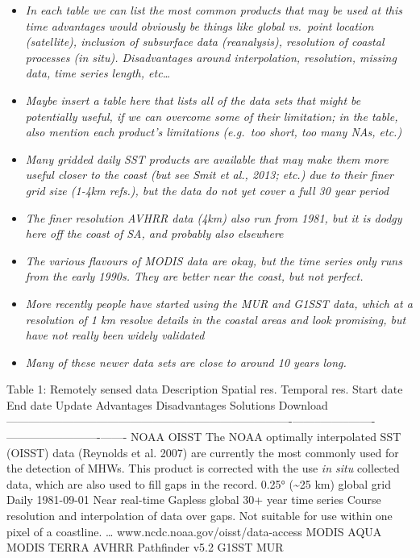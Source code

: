 \documentclass[]{article}
\providecommand{\tightlist}{%
  \setlength{\itemsep}{0pt}\setlength{\parskip}{0pt}}
\begin{document}
\begin{itemize}
\tightlist
\item
  \emph{In each table we can list the most common products that may be
  used at this time advantages would obviously be things like global
  vs.~point location (satellite), inclusion of subsurface data
  (reanalysis), resolution of coastal processes (in situ). Disadvantages
  around interpolation, resolution, missing data, time series length,
  etc\ldots{}}
\item
  \emph{Maybe insert a table here that lists all of the data sets that
  might be potentially useful, if we can overcome some of their
  limitation; in the table, also mention each product's limitations
  (e.g.~too short, too many NAs, etc.)}
\item
  \emph{Many gridded daily SST products are available that may make them
  more useful closer to the coast (but see Smit et al., 2013; etc.) due
  to their finer grid size (1-4km refs.), but the data do not yet cover
  a full 30 year period}
\item
  \emph{The finer resolution AVHRR data (4km) also run from 1981, but it
  is dodgy here off the coast of SA, and probably also elsewhere}
\item
  \emph{The various flavours of MODIS data are okay, but the time series
  only runs from the early 1990s. They are better near the coast, but
  not perfect.}
\item
  \emph{More recently people have started using the MUR and G1SST data,
  which at a resolution of 1 km resolve details in the coastal areas and
  look promising, but have not really been widely validated}
\item
  \emph{Many of these newer data sets are close to around 10 years
  long.}
\end{itemize}

Table 1: \textbar{}Remotely sensed data \textbar{}Description
\textbar{}Spatial res. \textbar{}Temporal res. \textbar{}Start date
\textbar{}End date \textbar{}Update \textbar{}Advantages
\textbar{}Disadvantages \textbar{}Solutions \textbar{}Download
\textbar{}
\textbar{}------------------\textbar{}------------------------------------------------\textbar{}----------\textbar{}--------\textbar{}--------\textbar{}-------\textbar{}------\textbar{}------\textbar{}------\textbar{}-------\textbar{}-------\textbar{}
\textbar{}NOAA OISST \textbar{}The NOAA optimally interpolated SST
(OISST) data (Reynolds et al. 2007) are currently the most commonly used
for the detection of MHWs. This product is corrected with the use
\emph{in situ} collected data, which are also used to fill gaps in the
record. \textbar{}0.25° (\textasciitilde{}25 km) global grid
\textbar{}Daily \textbar{}1981-09-01 \textbar{}Near real-time
\textbar{}Gapless global 30+ year time series \textbar{}Course
resolution and interpolation of data over gaps. Not suitable for use
within one pixel of a coastline. \textbar{}\ldots{}
\textbar{}www.ncdc.noaa.gov/oisst/data-access \textbar{} \textbar{}MODIS
AQUA \textbar{} \textbar{}MODIS TERRA \textbar{} \textbar{}AVHRR
Pathfinder v5.2 \textbar{} \textbar{}G1SST \textbar{} \textbar{}MUR
\textbar{}
\end{document}
